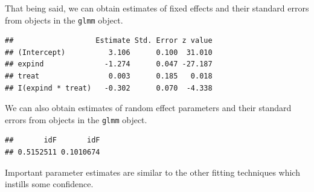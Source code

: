 \documentclass[
  ignorenonframetext,
]{beamer}
\newenvironment{Shaded}{\begin{snugshade}}{\end{snugshade}}
\newcommand{\CommentTok}[1]{\textcolor[rgb]{0.56,0.35,0.01}{\textit{#1}}}
\newcommand{\DecValTok}[1]{\textcolor[rgb]{0.00,0.00,0.81}{#1}}
\newcommand{\FunctionTok}[1]{\textcolor[rgb]{0.00,0.00,0.00}{#1}}
\newcommand{\NormalTok}[1]{#1}
\newcommand{\OtherTok}[1]{\textcolor[rgb]{0.56,0.35,0.01}{#1}}
\newcommand{\SpecialCharTok}[1]{\textcolor[rgb]{0.00,0.00,0.00}{#1}}
\newcommand{\StringTok}[1]{\textcolor[rgb]{0.31,0.60,0.02}{#1}}
\begin{document}
\begin{frame}[fragile]{}
\protect\hypertarget{section-16}{}
That being said, we can obtain estimates of fixed effects and their
standard errors from objects in the \texttt{glmm} object.

\vspace{12pt}
\tiny

\begin{Shaded}
\end{Shaded}

\begin{verbatim}
##                   Estimate Std. Error z value
## (Intercept)          3.106      0.100  31.010
## expind              -1.274      0.047 -27.187
## treat                0.003      0.185   0.018
## I(expind * treat)   -0.302      0.070  -4.338
\end{verbatim}
\end{frame}

\begin{frame}[fragile]{}
\protect\hypertarget{section-17}{}
We can also obtain estimates of random effect parameters and their
standard errors from objects in the \texttt{glmm} object.

\vspace{12pt}
\tiny

\begin{Shaded}
\end{Shaded}

\begin{verbatim}
##       idF       idF 
## 0.5152511 0.1010674
\end{verbatim}

\vspace{12pt}
\normalsize

Important parameter estimates are similar to the other fitting
techniques which instills some confidence.
\end{frame}
\end{document}
